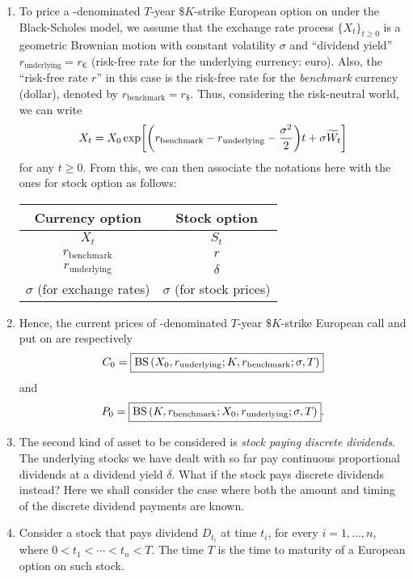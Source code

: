 \begin{enumerate}
\item To price a -denominated \(T\)-year \(\$K\)-strike European
option on  under the Black-Scholes model, we assume that the exchange
rate process \(\{X_t\}_{t\ge 0}\) is a geometric Brownian motion with constant
volatility \(\sigma\) and ``dividend yield''
\(r_{\mathrm{underlying}}=r_{\euro}\) (risk-free rate for the underlying
currency: euro). Also, the ``risk-free rate \(r\)'' in this case is the
risk-free rate for the \emph{benchmark} currency (dollar), denoted by
\(r_{\mathrm{benchmark}}=r_{\$}\). Thus, considering the risk-neutral world, we
can write
\[
X_t=X_0\exp[\qty(r_{\mathrm{benchmark}}-r_{\mathrm{underlying}}-\frac{\sigma^2}{2})t+\sigma\widetilde{W}_t]
\]
for any \(t\ge 0\). From this, we can then associate the notations here with
the ones for stock option as follows:
\begin{center}
\begin{tabular}{cc}
\toprule
Currency option&Stock option\\
\midrule
\(X_t\)&\(S_t\)\\
\(r_{\mathrm{benchmark}}\)&\(r\)\\
\(r_{\mathrm{underlying}}\)&\(\delta\)\\
\(\sigma\) (for exchange rates) &\(\sigma\) (for stock prices)\\
\bottomrule
\end{tabular}
\end{center}

\item Hence, the current prices of -denominated \(T\)-year
\(\$K\)-strike European call and put on  are respectively
\[
C_0=\boxed{\operatorname{BS}\qty(X_0,r_{\mathrm{underlying}};K,r_{\mathrm{benchmark}};\sigma,T)}
\]
and
\[
P_0=\boxed{\operatorname{BS}\qty(K,r_{\mathrm{benchmark}};X_0,r_{\mathrm{underlying}};\sigma,T)}.
\]
\item The second kind of asset to be considered is \emph{stock paying discrete
dividends}. The underlying stocks we have dealt with so far pay continuous
proportional dividends at a dividend yield \(\delta\). What if the stock pays
discrete dividends instead? Here we shall consider the case where both the
amount and timing of the discrete dividend payments are known.

\item Consider a stock that pays dividend \(D_{t_i}\) at time \(t_i\), for
every \(i=1,\dotsc,n\), where \(0<t_1<\dotsb<t_n<T\). The time \(T\) is the
time to maturity of a European option on such stock.


\end{enumerate}
